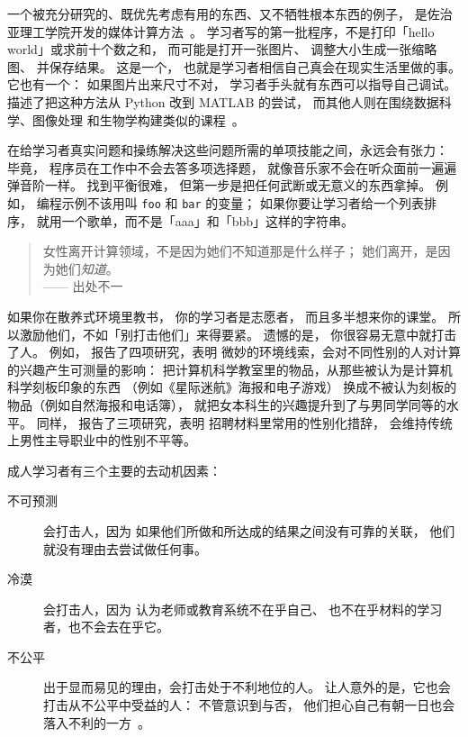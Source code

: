 一个被充分研究的、既优先考虑有用的东西、又不牺牲根本东西的例子，
是佐治亚理工学院开发的媒体计算方法~\cite{Guzd2013}。
学习者写的第一批程序，不是打印「hello world」或求前十个数之和，
而可能是打开一张图片、
调整大小生成一张缩略图、
并保存结果。
这是一个，
也就是学习者相信自己真会在现实生活里做的事。
它也有一个：
如果图片出来尺寸不对，
学习者手头就有东西可以指导自己调试。
\cite{Lee2013}描述了把这种方法从 Python 改到 MATLAB 的尝试，
而其他人则在围绕数据科学、图像处理
和生物学构建类似的课程~\cite{Dahl2018,Meys2018,Ritz2018}。

在给学习者真实问题和操练解决这些问题所需的单项技能之间，永远会有张力：
毕竟，
程序员在工作中不会去答多项选择题，
就像音乐家不会在听众面前一遍遍弹音阶一样。
找到平衡很难，
但第一步是把任何武断或无意义的东西拿掉。
例如，
编程示例不该用叫 \texttt{foo} 和 \texttt{bar} 的变量；
如果你要让学习者给一个列表排序，
就用一个歌单，而不是「aaa」和「bbb」这样的字符串。


\begin{quote}

  女性离开计算领域，不是因为她们不知道那是什么样子；
  她们离开，是因为她们\emph{知道}。\\
  —— 出处不一

\end{quote}

如果你在散养式环境里教书，
你的学习者是志愿者，
而且多半想来你的课堂。
所以激励他们，不如「别打击他们」来得要紧。
遗憾的是，
你很容易无意中就打击了人。
例如，
\cite{Cher2009}报告了四项研究，表明
微妙的环境线索，会对不同性别的人对计算的兴趣产生可测量的影响：
把计算机科学教室里的物品，从那些被认为是计算机科学刻板印象的东西
（例如《星际迷航》海报和电子游戏）
换成不被认为刻板的物品（例如自然海报和电话簿），
就把女本科生的兴趣提升到了与男同学同等的水平。
同样，
\cite{Gauc2011}报告了三项研究，表明
招聘材料里常用的性别化措辞，
会维持传统上男性主导职业中的性别不平等。

成人学习者有三个主要的去动机因素：

\begin{description}

\item[不可预测]
  会打击人，因为
  如果他们所做和所达成的结果之间没有可靠的关联，
  他们就没有理由去尝试做任何事。

\item[冷漠]
  会打击人，因为
  认为老师或教育系统不在乎自己、
  也不在乎材料的学习者，也不会去在乎它。

\item[不公平]
  出于显而易见的理由，会打击处于不利地位的人。
  让人意外的是，它也会打击从不公平中受益的人：
  不管意识到与否，
  他们担心自己有朝一日也会落入不利的一方~\cite{Wilk2011}。

\end{description}

